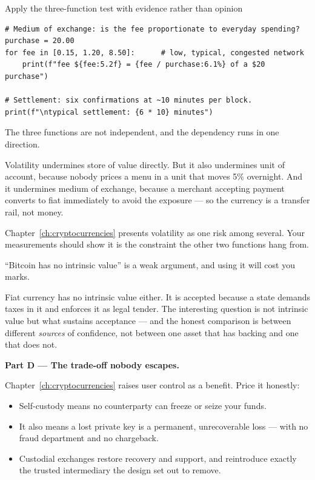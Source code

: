 \begin{labproject}{Apply the three-function test with evidence rather than opinion}
\begin{lstlisting}[style=utppython]
# Medium of exchange: is the fee proportionate to everyday spending?
purchase = 20.00
for fee in [0.15, 1.20, 8.50]:      # low, typical, congested network
    print(f"fee ${fee:5.2f} = {fee / purchase:6.1%} of a $20 purchase")

# Settlement: six confirmations at ~10 minutes per block.
print(f"\ntypical settlement: {6 * 10} minutes")
\end{lstlisting}

\begin{keyidea}
The three functions are not independent, and the dependency runs in one direction.

Volatility undermines store of value directly. But it also undermines unit of account, because nobody prices a menu in a unit that moves 5\% overnight. And it undermines medium of exchange, because a merchant accepting payment converts to fiat immediately to avoid the exposure --- so the currency is a transfer rail, not money.

Chapter~\ref{ch:cryptocurrencies} presents volatility as one risk among several. Your measurements should show it is the constraint the other two functions hang from.
\end{keyidea}

\begin{pitfall}
``Bitcoin has no intrinsic value'' is a weak argument, and using it will cost you marks.

Fiat currency has no intrinsic value either. It is accepted because a state demands taxes in it and enforces it as legal tender. The interesting question is not intrinsic value but what sustains acceptance --- and the honest comparison is between different \emph{sources} of confidence, not between one asset that has backing and one that does not.
\end{pitfall}

\medskip\noindent\textbf{Part D --- The trade-off nobody escapes.}\par
Chapter~\ref{ch:cryptocurrencies} raises user control as a benefit. Price it honestly:

\begin{itemize}
  \item Self-custody means no counterparty can freeze or seize your funds.
  \item It also means a lost private key is a permanent, unrecoverable loss --- with no fraud department and no chargeback.
  \item Custodial exchanges restore recovery and support, and reintroduce exactly the trusted intermediary the design set out to remove.
\end{itemize}


\end{labproject}
